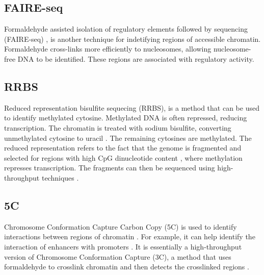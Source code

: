 \documentclass{frontiersENG} %
\begin{document}
\subsection{FAIRE-seq}
Formaldehyde assisted isolation of regulatory elements followed by
sequencing (FAIRE-seq) \cite{Giresi2009}, \cite{Giresi2007} is another
technique for indetifying regions of accessible
chromatin. Formaldehyde cross-links more efficiently to nucleosomes,
allowing nucleosome-free DNA to be identified. These regions are
associated with regulatory activity.

\subsection{RRBS}
Reduced representation bisulfite sequecing (RRBS), is a method that
can be used to identify methylated cytosine. Methylated DNA is often
repressed, reducing transcription. The chromatin is treated with
sodium bisulfite, converting unmethylated cytosine to uracil
\cite{Frommer1992}. The remaining cytosines are methylated. The
reduced representation refers to the fact that the genome is
fragmented and selected for regions with high CpG dinucleotide content
\cite{Dunham2012}, \cite{Meissner2005} where methylation represses
transcription. The fragments can then be sequenced using
high-throughput techniques \cite{Meissner2008}.

\subsection{5C}
Chromosome Conformation Capture Carbon Copy (5C) is used to identify
interactions between regions of chromatin \cite{Dostie2006}. For
example, it can help identify the interaction of enhancers with
promoters \cite{Sanyal2012}. It is essentially a high-throughput
version of Chromosome Conformation Capture (3C), a method that uses
formaldehyde to crosslink chromatin and then detects the crosslinked
regions \cite{Dekker2002}.
\end{document}

